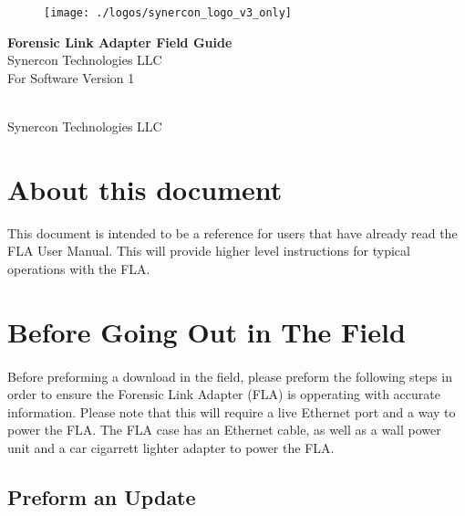 \documentclass[11pt]{article}
\newcommand*{\titleGP}{\begingroup %
\centering %
\vspace*{\baselineskip} %
\begin{figure}[tbph]
\centering
\texttt{[image: ./logos/synercon\_logo\_v3\_only]}
\label{fig:logo}
\end{figure}
\vspace{4cm}
{\Huge \textbf{Forensic Link Adapter Field Guide}}\\[2\baselineskip] %
{\Huge Synercon Technologies LLC}\\[2\baselineskip]
{\Large For Software Version 1}



\vfill %


\textcopyright {\scshape 2015} \\[0.3\baselineskip] %
Synercon Technologies LLC

\endgroup}
\begin{document}







\titleGP %

\newpage

\tableofcontents


\newpage
\section{About this document}
This document is intended to be a reference for users that have already read the FLA User Manual. This will provide higher level instructions for typical operations with the FLA.
\section{Before Going Out in The Field}
\paragraph{  }
Before preforming a download in the field, please preform the following steps in order to ensure the Forensic Link Adapter (FLA) is opperating with accurate information. Please note that this will require a live Ethernet port and a way to power the FLA. The FLA case has an Ethernet cable, as well as a wall power unit and a car cigarrett lighter adapter to power the FLA.
\subsection{Preform an Update}
\end{document}
